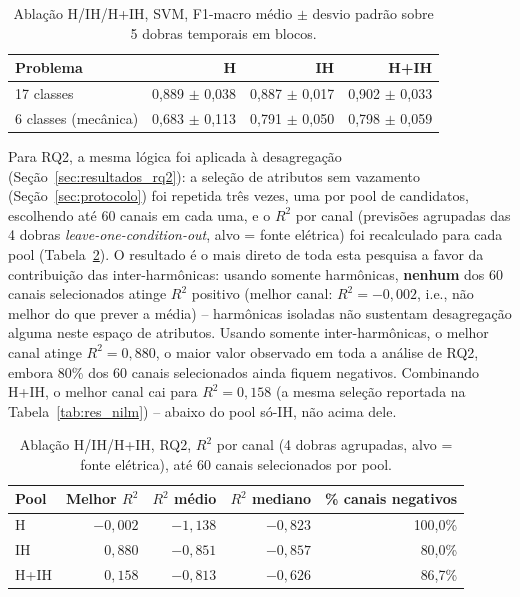 \documentclass[times,final]{elsarticle}
\begin{document}
{\begin{table}[H]
    \centering
    \caption{Ablação H/IH/H+IH, SVM, F1-macro médio $\pm$ desvio padrão sobre 5 dobras temporais em blocos.}
    \label{tab:res_ablacao}
    \begin{tabular}{@{}lrrr@{}}
        \toprule
        \textbf{Problema} & \textbf{H} & \textbf{IH} & \textbf{H+IH} \\
        \midrule
        17 classes & 0,889 $\pm$ 0,038 & 0,887 $\pm$ 0,017 & 0,902 $\pm$ 0,033 \\
        6 classes (mecânica) & 0,683 $\pm$ 0,113 & 0,791 $\pm$ 0,050 & 0,798 $\pm$ 0,059 \\
        \bottomrule
    \end{tabular}
\end{table}

Para RQ2, a mesma lógica foi aplicada à desagregação (Seção~\ref{sec:resultados_rq2}): a seleção de atributos sem vazamento (Seção~\ref{sec:protocolo}) foi repetida três vezes, uma por pool de candidatos, escolhendo até 60 canais em cada uma, e o $R^2$ por canal (previsões agrupadas das 4 dobras \textit{leave-one-condition-out}, alvo = fonte elétrica) foi recalculado para cada pool (Tabela~\ref{tab:res_ablacao_rq2}). O resultado é o mais direto de toda esta pesquisa a favor da contribuição das inter-harmônicas: usando somente harmônicas, \textbf{nenhum} dos 60 canais selecionados atinge $R^2$ positivo (melhor canal: $R^2=-0{,}002$, i.e., não melhor do que prever a média) -- harmônicas isoladas não sustentam desagregação alguma neste espaço de atributos. Usando somente inter-harmônicas, o melhor canal atinge $R^2=0{,}880$, o maior valor observado em toda a análise de RQ2, embora 80\% dos 60 canais selecionados ainda fiquem negativos. Combinando H+IH, o melhor canal cai para $R^2=0{,}158$ (a mesma seleção reportada na Tabela~\ref{tab:res_nilm}) -- abaixo do pool só-IH, não acima dele.

\begin{table}[H]
    \centering
    \caption{Ablação H/IH/H+IH, RQ2, $R^2$ por canal (4 dobras agrupadas, alvo = fonte elétrica), até 60 canais selecionados por pool.}
    \label{tab:res_ablacao_rq2}
    \begin{tabular}{@{}lrrrr@{}}
        \toprule
        \textbf{Pool} & \textbf{Melhor $R^2$} & \textbf{$R^2$ médio} & \textbf{$R^2$ mediano} & \textbf{\% canais negativos} \\
        \midrule
        H & $-0{,}002$ & $-1{,}138$ & $-0{,}823$ & 100,0\% \\
        IH & $0{,}880$ & $-0{,}851$ & $-0{,}857$ & 80,0\% \\
        H+IH & $0{,}158$ & $-0{,}813$ & $-0{,}626$ & 86,7\% \\
        \bottomrule
    \end{tabular}
\end{table}

}
\end{document}
